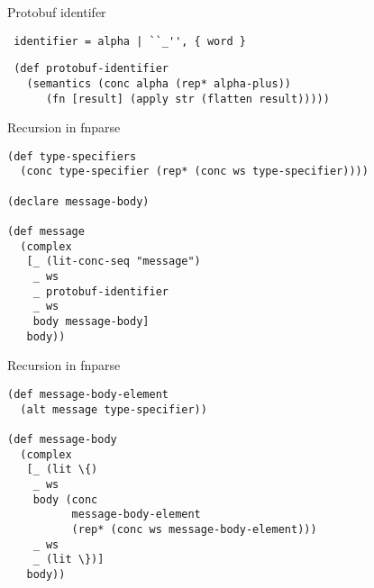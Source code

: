 \documentclass[presentation]{beamer}
\begin{document}
\begin{frame}[fragile]{Protobuf identifer}

\begin{verbatim}
 identifier = alpha | ``_'', { word }
\end{verbatim}

\begin{verbatim}
 (def protobuf-identifier
   (semantics (conc alpha (rep* alpha-plus))
      (fn [result] (apply str (flatten result)))))
\end{verbatim}

\end{frame}

\begin{frame}[fragile]{Recursion in fnparse}
\begin{verbatim}
(def type-specifiers
  (conc type-specifier (rep* (conc ws type-specifier))))

(declare message-body)

(def message
  (complex
   [_ (lit-conc-seq "message")
    _ ws
    _ protobuf-identifier
    _ ws
    body message-body]
   body))

\end{verbatim}
\end{frame}

\begin{frame}[fragile]{Recursion in fnparse}
\begin{verbatim}
(def message-body-element
  (alt message type-specifier))

(def message-body
  (complex
   [_ (lit \{)
    _ ws
    body (conc
          message-body-element
          (rep* (conc ws message-body-element)))
    _ ws
    _ (lit \})]
   body))
\end{verbatim}
\end{frame}
\end{document}
